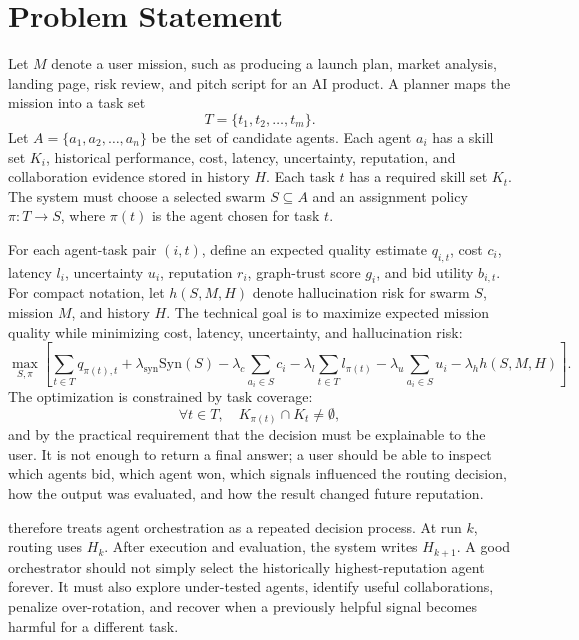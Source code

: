 \section{Problem Statement}

Let \(M\) denote a user mission, such as producing a launch plan, market analysis, landing page, risk review, and pitch script for an AI product. A planner maps the mission into a task set
\[
T = \{t_1,t_2,\ldots,t_m\}.
\]
Let \(A = \{a_1,a_2,\ldots,a_n\}\) be the set of candidate agents. Each agent \(a_i\) has a skill set \(K_i\), historical performance, cost, latency, uncertainty, reputation, and collaboration evidence stored in history \(H\). Each task \(t\) has a required skill set \(K_t\). The system must choose a selected swarm \(S \subseteq A\) and an assignment policy \(\pi:T \rightarrow S\), where \(\pi(t)\) is the agent chosen for task \(t\).

For each agent-task pair \((i,t)\), define an expected quality estimate \(q_{i,t}\), cost \(c_i\), latency \(l_i\), uncertainty \(u_i\), reputation \(r_i\), graph-trust score \(g_i\), and bid utility \(b_{i,t}\). For compact notation, let \(h(S,M,H)\) denote hallucination risk for swarm \(S\), mission \(M\), and history \(H\). The technical goal is to maximize expected mission quality while minimizing cost, latency, uncertainty, and hallucination risk:
\begin{equation}
\max_{S,\pi}
\left[
\sum_{t \in T} q_{\pi(t),t}
+ \lambda_{\mathrm{syn}}\mathrm{Syn}(S)
- \lambda_c \sum_{a_i \in S} c_i
- \lambda_l \sum_{t \in T} l_{\pi(t)}
- \lambda_u \sum_{a_i \in S} u_i
- \lambda_h h(S,M,H)
\right].
\end{equation}
The optimization is constrained by task coverage:
\begin{equation}
\forall t \in T,\quad K_{\pi(t)} \cap K_t \neq \emptyset,
\end{equation}
and by the practical requirement that the decision must be explainable to the user. It is not enough to return a final answer; a user should be able to inspect which agents bid, which agent won, which signals influenced the routing decision, how the output was evaluated, and how the result changed future reputation.

\systemname{} therefore treats agent orchestration as a repeated decision process. At run \(k\), routing uses \(H_k\). After execution and evaluation, the system writes \(H_{k+1}\). A good orchestrator should not simply select the historically highest-reputation agent forever. It must also explore under-tested agents, identify useful collaborations, penalize over-rotation, and recover when a previously helpful signal becomes harmful for a different task.
